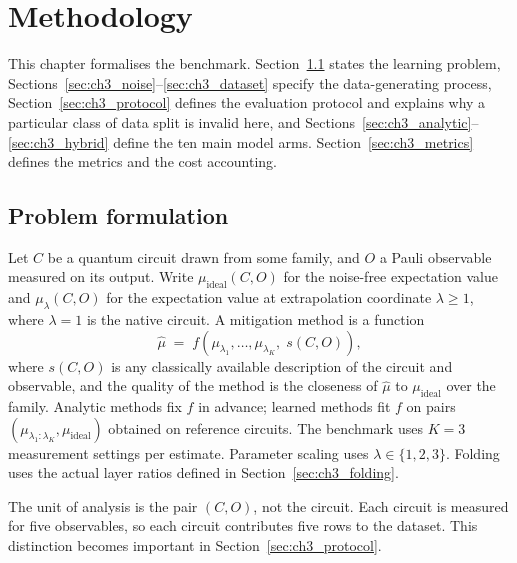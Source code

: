 \documentclass[Thesis.tex]{subfiles}
\begin{document}
\setcounter{chapter}{2} %



\chapter{Methodology}\label{chap3:methodology}

This chapter formalises the benchmark. Section~\ref{sec:ch3_formulation} states the
learning problem, Sections~\ref{sec:ch3_noise}--\ref{sec:ch3_dataset} specify the
data-generating process, Section~\ref{sec:ch3_protocol} defines the evaluation
protocol and explains why a particular class of data split is invalid here, and
Sections~\ref{sec:ch3_analytic}--\ref{sec:ch3_hybrid} define the ten main model arms.
Section~\ref{sec:ch3_metrics} defines the metrics and the cost accounting.

\section{Problem formulation}\label{sec:ch3_formulation}

Let $C$ be a quantum circuit drawn from some family, and $O$ a Pauli observable
measured on its output. Write $\mu_{\text{ideal}}(C, O)$ for the noise-free
expectation value and $\mu_\lambda(C, O)$ for the expectation value at
extrapolation coordinate $\lambda \geq 1$, where $\lambda = 1$ is the
native circuit. A mitigation method is a function
\begin{equation}
    \widehat{\mu} \;=\; f\!\left( \mu_{\lambda_1}, \ldots, \mu_{\lambda_K},\; s(C, O) \right),
    \label{eq:ch3_estimator}
\end{equation}
where $s(C, O)$ is any classically available description of the circuit and
observable, and the quality of the method is the closeness of $\widehat{\mu}$ to
$\mu_{\text{ideal}}$ over the family. Analytic methods fix $f$ in advance;
learned methods fit $f$ on pairs
$\left( \mu_{\lambda_1:\lambda_K}, \mu_{\text{ideal}} \right)$ obtained on reference
circuits. The benchmark uses $K = 3$ measurement settings per estimate.
Parameter scaling uses $\lambda \in \{1,2,3\}$. Folding uses the actual
layer ratios defined in Section~\ref{sec:ch3_folding}.

The unit of analysis is the pair $(C, O)$, not the circuit. Each circuit is measured
for five observables, so each circuit contributes five rows to the dataset. This
distinction becomes important in Section~\ref{sec:ch3_protocol}.
\end{document}
